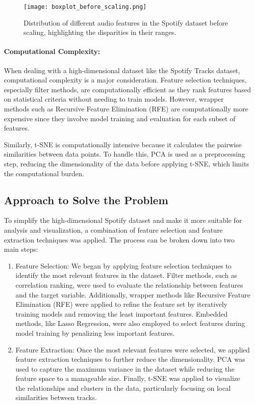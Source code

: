 \documentclass{article}
\begin{document}
\begin{figure}[h!]
    \centering
    \texttt{[image: boxplot\_before\_scaling.png]}
    \caption{Distribution of different audio features in the Spotify dataset before scaling, highlighting the disparities in their ranges.}
\end{figure}

\paragraph{Computational Complexity:}
When dealing with a high-dimensional dataset like the Spotify Tracks dataset, computational complexity is a major consideration. Feature selection techniques, especially filter methods, are computationally efficient as they rank features based on statistical criteria without needing to train models. However, wrapper methods such as Recursive Feature Elimination (RFE) are computationally more expensive since they involve model training and evaluation for each subset of features. 

Similarly, t-SNE is computationally intensive because it calculates the pairwise similarities between data points. To handle this, PCA is used as a preprocessing step, reducing the dimensionality of the data before applying t-SNE, which limits the computational burden.

\subsection{Approach to Solve the Problem}

To simplify the high-dimensional Spotify dataset and make it more suitable for analysis and visualization, a combination of feature selection and feature extraction techniques was applied. The process can be broken down into two main steps:

\begin{enumerate}
    \item {Feature Selection}: We began by applying feature selection techniques to identify the most relevant features in the dataset. Filter methods, such as correlation ranking, were used to evaluate the relationship between features and the target variable. Additionally, wrapper methods like Recursive Feature Elimination (RFE) were applied to refine the feature set by iteratively training models and removing the least important features. Embedded methods, like Lasso Regression, were also employed to select features during model training by penalizing less important features.
    
    \item {Feature Extraction}: Once the most relevant features were selected, we applied feature extraction techniques to further reduce the dimensionality. PCA was used to capture the maximum variance in the dataset while reducing the feature space to a manageable size. Finally, t-SNE was applied to visualize the relationships and clusters in the data, particularly focusing on local similarities between tracks.
\end{enumerate}
\end{document}

